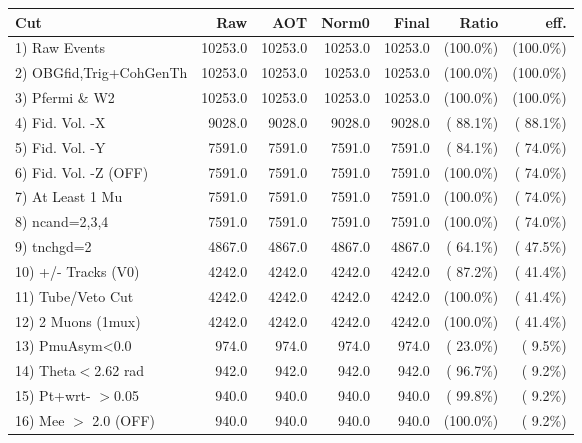  \begin{table}[h!]\centering
 \begin{tabular}{||l||r|r|r|r|r|r||}
 \hline
 \hline
 Cut & Raw & AOT & Norm0 & Final & Ratio & eff.       \\
 \hline
  1) Raw Events           &      10253.0 &      10253.0 &      10253.0 &      10253.0 & (100.0\%) & (100.0\%) \\
  2) OBGfid,Trig+CohGenTh &      10253.0 &      10253.0 &      10253.0 &      10253.0 & (100.0\%) & (100.0\%) \\
  3) Pfermi \& W2         &      10253.0 &      10253.0 &      10253.0 &      10253.0 & (100.0\%) & (100.0\%) \\
  4) Fid. Vol. -X         &       9028.0 &       9028.0 &       9028.0 &       9028.0 & ( 88.1\%) & ( 88.1\%) \\
  5) Fid. Vol. -Y         &       7591.0 &       7591.0 &       7591.0 &       7591.0 & ( 84.1\%) & ( 74.0\%) \\
  6) Fid. Vol. -Z (OFF)   &       7591.0 &       7591.0 &       7591.0 &       7591.0 & (100.0\%) & ( 74.0\%) \\
  7) At Least 1 Mu        &       7591.0 &       7591.0 &       7591.0 &       7591.0 & (100.0\%) & ( 74.0\%) \\
  8) ncand=2,3,4          &       7591.0 &       7591.0 &       7591.0 &       7591.0 & (100.0\%) & ( 74.0\%) \\
  9) tnchgd=2             &       4867.0 &       4867.0 &       4867.0 &       4867.0 & ( 64.1\%) & ( 47.5\%) \\
 10) +/- Tracks (V0)      &       4242.0 &       4242.0 &       4242.0 &       4242.0 & ( 87.2\%) & ( 41.4\%) \\
 11) Tube/Veto Cut        &       4242.0 &       4242.0 &       4242.0 &       4242.0 & (100.0\%) & ( 41.4\%) \\
 12) 2 Muons (1mux)       &       4242.0 &       4242.0 &       4242.0 &       4242.0 & (100.0\%) & ( 41.4\%) \\
 13) PmuAsym<0.0          &        974.0 &        974.0 &        974.0 &        974.0 & ( 23.0\%) & (  9.5\%) \\
 14) Theta$<$2.62 rad     &        942.0 &        942.0 &        942.0 &        942.0 & ( 96.7\%) & (  9.2\%) \\
 15) Pt+wrt- $>$0.05      &        940.0 &        940.0 &        940.0 &        940.0 & ( 99.8\%) & (  9.2\%) \\
 16) Mee $>$ 2.0  (OFF)   &        940.0 &        940.0 &        940.0 &        940.0 & (100.0\%) & (  9.2\%) \\

\end{tabular}
\end{table}
